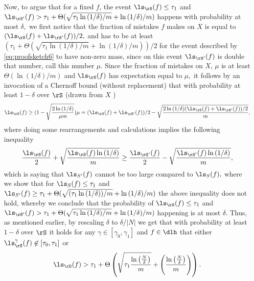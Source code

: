 Now, to argue that for a fixed $ f $, the event $ \ls_{\rS}(f)\leq \tau_{1} $ and $ \ls_{\rS'}(f)>\tau_{1}+\Theta(\sqrt{\tau_{1}\ln{\left(1/\delta \right)}/m}+\ln{\left(1/\delta \right)}/m) $ happens with probability at most $ \delta, $ we first notice that the fraction of mistakes $ f $ makes on $ X $ is equal to $ (\ls_{\rS}(f)+\ls_{\rS'}(f))/2,$ and has to be at least $ (\tau_{1}+\Theta(\sqrt{\tau_{1}\ln{\left(1/\delta \right)}/m}+\ln{\left(1/\delta \right)}/m))/2 $ for the event described by \cref{eq:proofsketch6} to have non-zero mass, since on this event $ \ls_{\rS'}(f) $ is double that number, call this number $ \mu.$ Since the fraction of mistakes on $ X $, $ \mu $ is at least $ \Theta(\ln{\left( 1/\delta\right)}/m) $ and $ \ls_{\rS}(f) $ has expectation equal to $ \mu,$ it follows by an invocation of a Chernoff bound (without replacement) that with probability at least $ 1-\delta $ over $ \rS $ (drawn from $ X $ ) 
\begin{align*}
\ls_{\rS}(f)\geq (1-\sqrt{\frac{2\ln{\left(1/\delta \right)}}{\mu m}})\mu=(\ls_{\rS}(f)+\ls_{\rS'}(f))/2-\sqrt{\frac{2\ln{\left(1/\delta \right)}(\ls_{\rS}(f)+\ls_{\rS'}(f))/2}{m}}, 
\end{align*}    
where doing some rearrangements and calculations implies the following inequality
\begin{align*}
\frac{\ls_{\rS}(f)}{2}+\sqrt{\frac{\ls_{\rS}(f)\ln{\left(1/\delta \right)}}{m}}\geq \frac{\ls_{\rS'}(f)}{2}-\sqrt{\frac{\ls_{\rS'}(f)\ln{\left(1/\delta \right)}}{m}},
\end{align*}
which is saying that $ \ls_{S'}(f) $ cannot be too large compared to $ \ls_{S}(f),$ where we show that for $ \ls_{S}(f)\leq \tau_{1} $ and $ \ls_{S'}(f)\geq \tau_{1}+\Theta(\sqrt{(\tau_{1}\ln{\left(1/\delta \right)})/m}+\ln{\left(1/\delta \right)}/m)$ the above inequality does not hold, whereby we conclude that the probability of $ \ls_{\rS}(f)\leq \tau_{1} $ and $ \ls_{\rS'}(f)>\tau_{1}+\Theta(\sqrt{\tau_{1}\ln{\left(1/\delta \right)}/m}+\ln{\left(1/\delta \right)}/m) $ happening is at most $ \delta. $ Thus, as mentioned earlier, by rescaling $ \delta $ to $ \delta/|N| $ we get that with probability at least $ 1-\delta $ over $ \rS $ it holds for any $ \gamma\in[\gamma_{0},\gamma_{1}] $ and $f\in \dlh $ that either $ \ls_{\rS}^{\gamma}(f) \not\in [\tau_{0},\tau_{1}]$ or
\begin{align}\label{eq:proofsketch7}
\ls_{\cD}(f)> \tau_{1}+\Theta\left(\sqrt{\tau_{1}\frac{\ln{\left(\frac{N}{\delta}\right)}}{m} }+\left(\frac{\ln{\left(\frac{N}{\delta}\right)}}{m} \right) \right).
\end{align}
